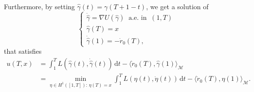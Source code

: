 \documentclass[a4paper,10pt]{amsart}
\newcommand{\ud}{\mathrm{d}}
\theoremstyle{plain}
\theoremstyle{definition}
\numberwithin{equation}{section}
\numberwithin{thm}{section}
\begin{document}
Furthermore, by setting $\hat \gamma(t)=\gamma(T+1-t)$, we get a solution of
\[
\begin{cases}
\ddot{\hat\gamma} = \nabla U(\hat \gamma) \ \mbox{ a.e. in } \ (1,T)
\\
\hat\gamma(T)=x
\\
\dot{\hat\gamma}(1)=-\dot r_0(T),
\end{cases}
\]
that satisfies
\begin{equation}\label{eq:u(T,x)_vers2}
\begin{split}
u(T,x) &=\int_1^T L(\hat\gamma(t),\dot{\hat\gamma}(t))\, \ud t -\langle \dot r_0(T), \hat\gamma(1)\rangle_\mathcal{M}
\\
&= \min_{\eta \in H^1([1,T]):\, \eta(T)=x}\int_1^T L(\eta(t),\dot\eta(t))\, \ud t -
\langle \dot r_0(T), \eta(1)\rangle_\mathcal{M}.
\end{split}
\end{equation}
\end{document}
